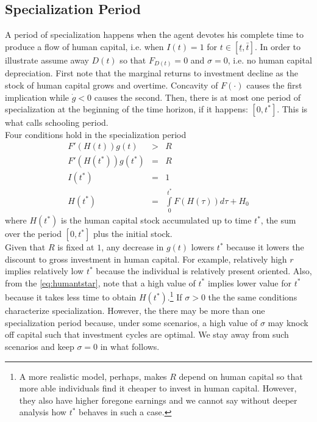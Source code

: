 \subsection{Specialization Period}
A period of specialization happens when the agent devotes his complete time to produce a flow of human capital, i.e. when $I(t) = 1$ for $t \in [ \underline{t}, \bar{t}]$. In order to illustrate assume away $D(t)$ so that $F_{D(t)} = 0$ and $\sigma = 0$, i.e. no human capital depreciation. First note that the marginal returns to investment decline as the stock of human capital grows and overtime. Concavity of $F(\cdot)$ causes the first implication while $\dot{g} < 0$ causes the second. Then, there is at most one period of specialization at the beginning of the time horizon, if it happens: $[0,t^*]$. This is what \citet{ben1967production} calls schooling period.\\
\indent Four conditions hold in the specialization period
\begin{eqnarray}
F'(H(t))g(t) &>& R \nonumber \\
F'(H(t^*))g(t^*) &=& R \nonumber \\
I(t^*) &=& 1 \nonumber \\
H(t^*) &=& \int \limits _{0} ^{t^*} F (H(\tau)) d\tau + H_{0} \label{eq:humantstar}
\end{eqnarray} 
\noindent where $H(t^*)$ is the human capital stock accumulated up to time $t^*$, the sum over the period $[0,t^*]$ plus the initial stock.\\
\indent Given that $R$ is fixed at $1$, any decrease in $g(t)$ lowers $t^*$ because it lowers the discount to gross investment in human capital. For example, relatively high $r$ implies relatively low $t^*$ because the individual is relatively present oriented. Also, from the \eqref{eq:humantstar}, note that a high value of $t^*$ implies lower value for $t^*$ because it takes less time to obtain $H(t^*)$.\footnote{A more realistic model, perhaps, makes $R$ depend on human capital so that more able individuals find it cheaper to invest in human capital. However, they also have higher foregone earnings and we cannot say without deeper analysis how $t^*$ behaves in such a case.} If $\sigma > 0 $ the the same conditions characterize specialization. However, the there may be more than one specialization period because, under some scenarios, a high value of $\sigma$ may knock off capital such that investment cycles are optimal. We stay away from such scenarios and keep $\sigma = 0$ in what follows.
